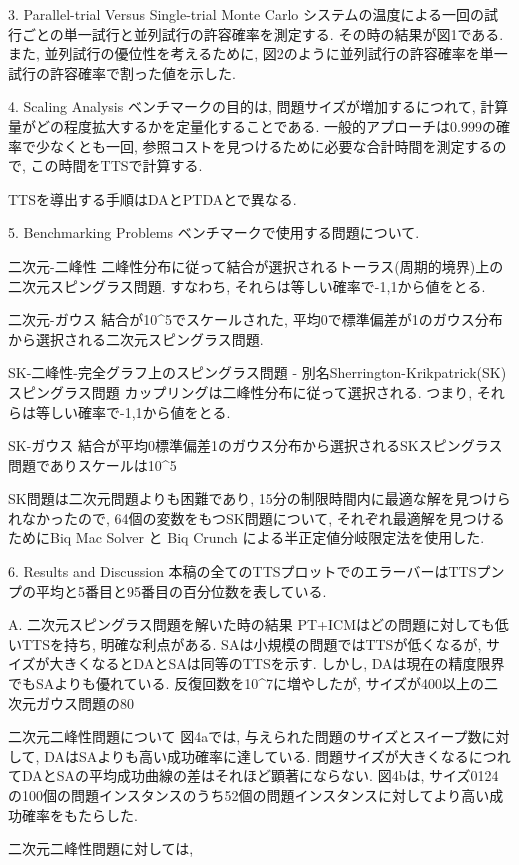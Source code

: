 3. Parallel-trial Versus Single-trial Monte Carlo
システムの温度による一回の試行ごとの単一試行と並列試行の許容確率を測定する. 
その時の結果が図1である. 
また, 並列試行の優位性を考えるために, 図2のように並列試行の許容確率を単一試行の許容確率で割った値を示した. 

4. Scaling Analysis
ベンチマークの目的は, 問題サイズが増加するにつれて, 計算量がどの程度拡大するかを定量化することである. 
一般的アプローチは0.999の確率で少なくとも一回, 参照コストを見つけるために必要な合計時間を測定するので, この時間をTTSで計算する. 

TTSを導出する手順はDAとPTDAとで異なる. 

5. Benchmarking Problems
ベンチマークで使用する問題について. 

二次元-二峰性
  二峰性分布に従って結合が選択されるトーラス(周期的境界)上の二次元スピングラス問題. すなわち, それらは等しい確率で{-1,1}から値をとる. 
  
二次元-ガウス
  結合が10^5でスケールされた, 平均0で標準偏差が1のガウス分布から選択される二次元スピングラス問題. 
  
SK-二峰性-完全グラフ上のスピングラス問題 - 別名Sherrington-Krikpatrick(SK)スピングラス問題
  カップリングは二峰性分布に従って選択される. つまり, それらは等しい確率で{-1,1}から値をとる. 
  
SK-ガウス
  結合が平均0標準偏差1のガウス分布から選択されるSKスピングラス問題でありスケールは10^5

SK問題は二次元問題よりも困難であり, 15分の制限時間内に最適な解を見つけられなかったので, 64個の変数をもつSK問題について, それぞれ最適解を見つけるためにBiq Mac Solver と Biq Crunch による半正定値分岐限定法を使用した. 

6. Results and Discussion
本稿の全てのTTSプロットでのエラーバーはTTSプンプの平均と5番目と95番目の百分位数を表している. 

A. 二次元スピングラス問題を解いた時の結果
PT+ICMはどの問題に対しても低いTTSを持ち, 明確な利点がある. 
SAは小規模の問題ではTTSが低くなるが, サイズが大きくなるとDAとSAは同等のTTSを示す. 
しかし, DAは現在の精度限界でもSAよりも優れている. 
反復回数を10^7に増やしたが, サイズが400以上の二次元ガウス問題の80%

二次元二峰性問題について
図4aでは, 与えられた問題のサイズとスイープ数に対して, DAはSAよりも高い成功確率に達している. 
問題サイズが大きくなるにつれてDAとSAの平均成功曲線の差はそれほど顕著にならない. 
図4bは, サイズ0124の100個の問題インスタンスのうち52個の問題インスタンスに対してより高い成功確率をもたらした. 

二次元二峰性問題に対しては, 


